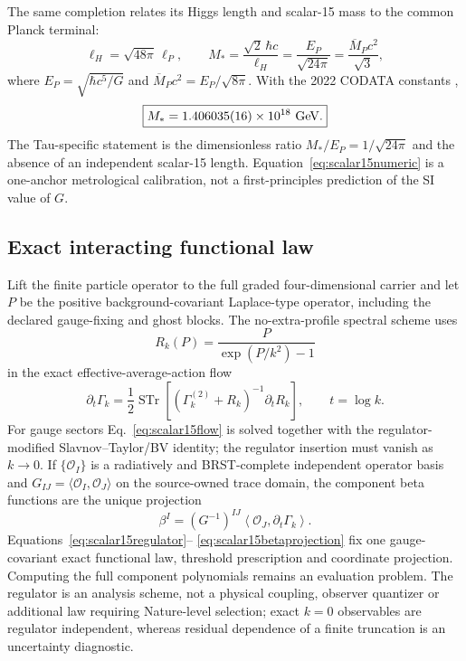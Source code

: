 The same completion relates its Higgs length and scalar-15 mass to the common
Planck terminal:
\begin{equation}
 \ell_H=\sqrt{48\pi}\,\ell_P,
 \qquad
 M_*=\frac{\sqrt2\,\hbar c}{\ell_H}
 =\frac{E_P}{\sqrt{24\pi}}
 =\frac{\overline M_Pc^2}{\sqrt3},
 \label{eq:scalar15scale}
\end{equation}
where \(E_P=\sqrt{\hbar c^5/G}\) and
\(\overline M_Pc^2=E_P/\sqrt{8\pi}\).  With the 2022 CODATA constants
\citep{CODATA2022},
\begin{equation}
 \boxed{M_*=1.406035(16)\times10^{18}\ {\rm GeV}.}
 \label{eq:scalar15numeric}
\end{equation}
The Tau-specific statement is the dimensionless ratio
\(M_*/E_P=1/\sqrt{24\pi}\) and the absence of an independent scalar-15 length.
Equation~\eqref{eq:scalar15numeric} is a one-anchor metrological calibration,
not a first-principles prediction of the SI value of \(G\).

\subsection{Exact interacting functional law}

Lift the finite particle operator to the full graded four-dimensional carrier
and let \(P\) be the positive background-covariant Laplace-type operator,
including the declared gauge-fixing and ghost blocks.  The no-extra-profile
spectral scheme uses
\begin{equation}
 \boxed{R_k(P)=\frac{P}{\exp(P/k^2)-1}}
 \label{eq:scalar15regulator}
\end{equation}
in the exact effective-average-action flow \citep{Wetterich1993}
\begin{equation}
 \boxed{
 \partial_t\Gamma_k=\frac{1}{2}\operatorname{STr}
 \left[(\Gamma_k^{(2)}+R_k)^{-1}\partial_tR_k\right],
 \qquad t=\log k .}
 \label{eq:scalar15flow}
\end{equation}
For gauge sectors Eq.~\eqref{eq:scalar15flow} is solved together with the
regulator-modified Slavnov--Taylor/BV identity; the regulator insertion must
vanish as \(k\to0\).  If \(\{\mathcal O_I\}\) is a radiatively and
BRST-complete independent operator basis and
\(G_{IJ}=\langle\mathcal O_I,\mathcal O_J\rangle\) on the source-owned trace
domain, the component beta functions are the unique projection
\begin{equation}
 \boxed{
 \beta^I=(G^{-1})^{IJ}
 \left\langle\mathcal O_J,\partial_t\Gamma_k\right\rangle .}
 \label{eq:scalar15betaprojection}
\end{equation}
Equations~\eqref{eq:scalar15regulator}--
\eqref{eq:scalar15betaprojection} fix one gauge-covariant exact functional
law, threshold prescription and coordinate projection.  Computing the full
component polynomials remains an evaluation problem.  The regulator is an
analysis scheme, not a physical coupling, observer quantizer or additional
law requiring Nature-level selection; exact \(k=0\) observables are regulator
independent, whereas residual dependence of a finite truncation is an
uncertainty diagnostic.

